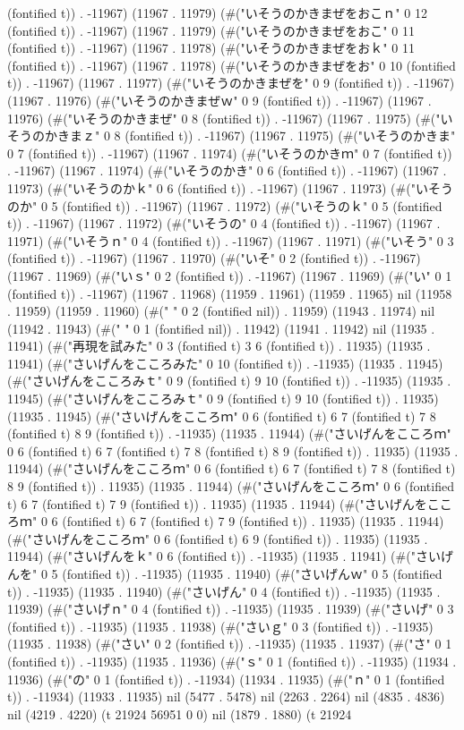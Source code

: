 (fontified t)) . -11967) (11967 . 11979) (#("いそうのかきまぜをおこｎ" 0 12 (fontified t)) . -11967) (11967 . 11979) (#("いそうのかきまぜをおこ" 0 11 (fontified t)) . -11967) (11967 . 11978) (#("いそうのかきまぜをおｋ" 0 11 (fontified t)) . -11967) (11967 . 11978) (#("いそうのかきまぜをお" 0 10 (fontified t)) . -11967) (11967 . 11977) (#("いそうのかきまぜを" 0 9 (fontified t)) . -11967) (11967 . 11976) (#("いそうのかきまぜｗ" 0 9 (fontified t)) . -11967) (11967 . 11976) (#("いそうのかきまぜ" 0 8 (fontified t)) . -11967) (11967 . 11975) (#("いそうのかきまｚ" 0 8 (fontified t)) . -11967) (11967 . 11975) (#("いそうのかきま" 0 7 (fontified t)) . -11967) (11967 . 11974) (#("いそうのかきｍ" 0 7 (fontified t)) . -11967) (11967 . 11974) (#("いそうのかき" 0 6 (fontified t)) . -11967) (11967 . 11973) (#("いそうのかｋ" 0 6 (fontified t)) . -11967) (11967 . 11973) (#("いそうのか" 0 5 (fontified t)) . -11967) (11967 . 11972) (#("いそうのｋ" 0 5 (fontified t)) . -11967) (11967 . 11972) (#("いそうの" 0 4 (fontified t)) . -11967) (11967 . 11971) (#("いそうｎ" 0 4 (fontified t)) . -11967) (11967 . 11971) (#("いそう" 0 3 (fontified t)) . -11967) (11967 . 11970) (#("いそ" 0 2 (fontified t)) . -11967) (11967 . 11969) (#("いｓ" 0 2 (fontified t)) . -11967) (11967 . 11969) (#("い" 0 1 (fontified t)) . -11967) (11967 . 11968) (11959 . 11961) (11959 . 11965) nil (11958 . 11959) (11959 . 11960) (#("	 " 0 2 (fontified nil)) . 11959) (11943 . 11974) nil (11942 . 11943) (#(" " 0 1 (fontified nil)) . 11942) (11941 . 11942) nil (11935 . 11941) (#("再現を試みた" 0 3 (fontified t) 3 6 (fontified t)) . 11935) (11935 . 11941) (#("さいげんをこころみた" 0 10 (fontified t)) . -11935) (11935 . 11945) (#("さいげんをこころみｔ" 0 9 (fontified t) 9 10 (fontified t)) . -11935) (11935 . 11945) (#("さいげんをこころみｔ" 0 9 (fontified t) 9 10 (fontified t)) . 11935) (11935 . 11945) (#("さいげんをこころｍ" 0 6 (fontified t) 6 7 (fontified t) 7 8 (fontified t) 8 9 (fontified t)) . -11935) (11935 . 11944) (#("さいげんをこころｍ" 0 6 (fontified t) 6 7 (fontified t) 7 8 (fontified t) 8 9 (fontified t)) . 11935) (11935 . 11944) (#("さいげんをこころｍ" 0 6 (fontified t) 6 7 (fontified t) 7 8 (fontified t) 8 9 (fontified t)) . 11935) (11935 . 11944) (#("さいげんをこころｍ" 0 6 (fontified t) 6 7 (fontified t) 7 9 (fontified t)) . 11935) (11935 . 11944) (#("さいげんをこころｍ" 0 6 (fontified t) 6 7 (fontified t) 7 9 (fontified t)) . 11935) (11935 . 11944) (#("さいげんをこころｍ" 0 6 (fontified t) 6 9 (fontified t)) . 11935) (11935 . 11944) (#("さいげんをｋ" 0 6 (fontified t)) . -11935) (11935 . 11941) (#("さいげんを" 0 5 (fontified t)) . -11935) (11935 . 11940) (#("さいげんｗ" 0 5 (fontified t)) . -11935) (11935 . 11940) (#("さいげん" 0 4 (fontified t)) . -11935) (11935 . 11939) (#("さいげｎ" 0 4 (fontified t)) . -11935) (11935 . 11939) (#("さいげ" 0 3 (fontified t)) . -11935) (11935 . 11938) (#("さいｇ" 0 3 (fontified t)) . -11935) (11935 . 11938) (#("さい" 0 2 (fontified t)) . -11935) (11935 . 11937) (#("さ" 0 1 (fontified t)) . -11935) (11935 . 11936) (#("ｓ" 0 1 (fontified t)) . -11935) (11934 . 11936) (#("の" 0 1 (fontified t)) . -11934) (11934 . 11935) (#("ｎ" 0 1 (fontified t)) . -11934) (11933 . 11935) nil (5477 . 5478) nil (2263 . 2264) nil (4835 . 4836) nil (4219 . 4220) (t 21924 56951 0 0) nil (1879 . 1880) (t 21924 